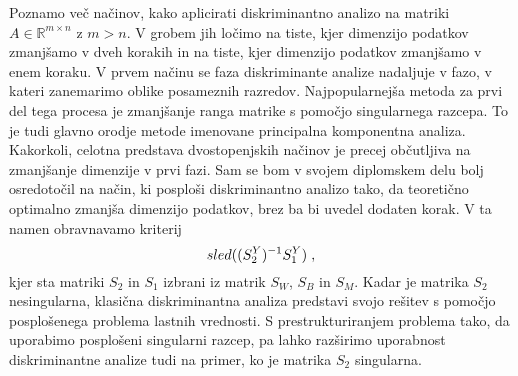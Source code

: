 \documentclass[mat1]{article}
\begin{document}
Poznamo več načinov, kako aplicirati diskriminantno analizo na matriki $A \in \mathbb{R}^{m \times n}$ z $m > n$. V grobem jih ločimo na tiste, kjer dimenzijo podatkov zmanjšamo v dveh korakih in na tiste, kjer dimenzijo podatkov zmanjšamo v enem koraku. V prvem načinu se faza diskriminante analize nadaljuje v fazo, v kateri zanemarimo oblike posameznih razredov. Najpopularnejša metoda za prvi del tega procesa je zmanjšanje ranga matrike s pomočjo singularnega razcepa. To je tudi glavno orodje metode imenovane principalna komponentna analiza. Kakorkoli, celotna predstava dvostopenjskih načinov je precej občutljiva na zmanjšanje dimenzije v prvi fazi. Sam se bom v svojem diplomskem delu bolj osredotočil na način, ki posploši diskriminantno analizo tako, da teoretično optimalno zmanjša dimenzijo podatkov, brez ba bi uvedel dodaten korak. V ta namen obravnavamo kriterij 
$$ sled((S_2^Y)^{-1} S_1^Y) \hspace{1mm} \text{,}
$$
kjer sta matriki $S_2$ in $S_1$ izbrani iz matrik $S_W$, $S_B$ in $S_M$.  Kadar je matrika $S_2$ nesingularna, klasična diskriminantna analiza predstavi svojo rešitev s pomočjo posplošenega problema lastnih vrednosti. S prestrukturiranjem problema tako, da uporabimo posplošeni singularni razcep, pa lahko razširimo uporabnost diskriminantne analize tudi na primer, ko je matrika $S_2$ singularna.
\end{document}
